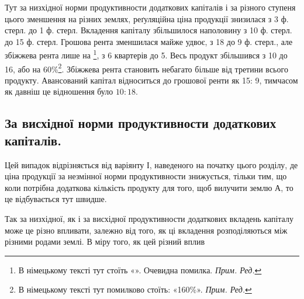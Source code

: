 Тут за низхідної норми продуктивности додаткових капіталів і за різного
ступеня цього зменшення на різних землях, реґуляційна ціна продукції знизилася
з 3 ф. стерл. до 1 ф. стерл. Вкладення капіталу збільшилося наполовину з 10 ф.
стерл. до 15 ф. стерл. Грошова рента зменшилася майже удвоє, з 18 до 9 ф.
стерл., але збіжжева рента лише на  \footnote*{
В німецькому тексті тут стоїть «». Очевидна помилка. \emph{Прим. Ред.}
}, з 6 квартерів до 5. Весь продукт
збільшився з 10 до 16, або на 60\%\footnote*{
В німецькому тексті тут помилково стоїть: «160\%». \emph{Прим. Ред.}
}. Збіжжева рента становить небагато більше
від третини всього продукту. Авансований капітал відноситься до грошової ренти
як 15: 9, тимчасом як давніш це відношення було $10:18$.

\subsection{За висхідної норми продуктивности додаткових капіталів.}

Цей випадок відрізняється від варіянту І, наведеного на початку цього
розділу, де ціна продукції за незмінної норми продуктивности знижується, тільки
тим, що коли потрібна додаткова кількість продукту для того, щоб вилучити
землю $А$, то це відбувається тут швидше.

Так за низхідної, як і за висхідної продуктивности додаткових вкладень
капіталу може це різно впливати, залежно від того, як ці вкладення розподіляються
між різними родами землі. В міру того, як цей різний вплив
\parbreak{}  %
